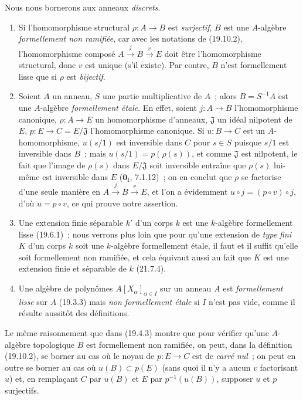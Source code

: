 
\begin{examples}[19.10.3]
\label{0.19.10.3-fr}
Nous nous bornerons aux anneaux \emph{discrets}.
\begin{enumerate}
  \item[(i)] Si l'homomorphisme structural $\rho:A\to B$ est \emph{surjectif},
  $B$ est une $A$-algèbre \emph{formellement non ramifiée}, car avec les
  notations de (19.10.2), l'homomorphisme composé
  $A\xrightarrow{j}B\xrightarrow{v}E$ doit être l'homomorphisme structural,
  donc $v$ est unique (s'il existe). Par contre, $B$ n'est formellement lisse
  que si $\rho$ est \emph{bijectif}.
  \item[(ii)] Soient $A$ un anneau, $S$ une partie multiplicative de $A$~;
  alors $B=S^{-1}A$ est une $A$-algèbre \emph{formellement étale}. En effet,
  soient $j:A\to B$ l'homomorphisme canonique, $\rho:A\to E$ un homomorphisme
  d'anneaux, $\mathfrak J$ un idéal nilpotent de $E$,
  $p:E\to C=E/\mathfrak J$ l'homomorphisme canonique. Si $u:B\to C$ est un
  $A$-homomorphisme, $u(s/1)$ est inversible dans $C$ pour $s\in S$ puisque
  $s/1$ est inversible dans $B$~; mais $u(s/1)=p(\rho(s))$, et comme
  $\mathfrak J$ est nilpotent, le fait que l'image de $\rho(s)$ dans
  $E/\mathfrak J$ soit inversible entraîne que $\rho(s)$ lui-même est
  inversible dans $E$ ($\mathbf 0_{\mathrm I}$, 7.1.12)~; on en conclut que
  $\rho$ se factorise d'une seule manière en
  $A\xrightarrow{j}B\xrightarrow{v}E$, et l'on a évidemment
  $u\circ j=(p\circ v)\circ j$, d'où $u=p\circ v$, ce qui prouve notre
  assertion.
  \item[(iii)] Une extension finie séparable $k'$ d'un corps $k$ est une
  $k$-algèbre formellement lisse (19.6.1)~; nous verrons plus loin que pour
  qu'une extension de \emph{type fini} $K$ d'un corps $k$ soit une $k$-algèbre
  formellement étale, il faut et il suffit qu'elle soit formellement non
  ramifiée, et cela équivaut aussi au fait que $K$ est une extension finie et
  séparable de $k$ (21.7.4).
  \item[(iv)] Une algèbre de polynômes $A[X_\alpha]_{\alpha\in I}$ sur un
  anneau $A$ est \emph{formellement lisse} sur $A$ (19.3.3) mais \emph{non
  formellement étale} si $I$ n'est pas vide, comme il résulte aussitôt des
  définitions.
\end{enumerate}
\end{examples}

\begin{remark}[19.10.4]
\label{0.19.10.4-fr}
Le même raisonnement que dans (19.4.3) montre que pour vérifier qu'une
$A$-algèbre topologique $B$ est formellement non ramifiée, on peut, dans la
définition (19.10.2), se borner au cas où le noyau de $p:E\to C$ est de
\emph{carré nul}~; on peut en outre se borner au cas où $u(B)\subset p(E)$
(sans quoi il n'y a aucun $v$ factorisant $u$) et, en remplaçant $C$ par $u(B)$
et $E$ par $p^{-1}(u(B))$, supposer $u$ et $p$ surjectifs.
\end{remark}
